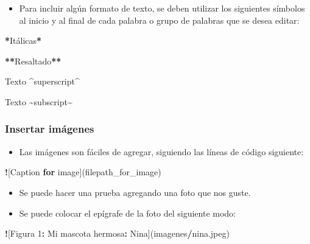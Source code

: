\documentclass[
]{article}
\newenvironment{Shaded}{\begin{snugshade}}{\end{snugshade}}
\newcommand{\ControlFlowTok}[1]{\textcolor[rgb]{0.13,0.29,0.53}{\textbf{#1}}}
\newcommand{\DecValTok}[1]{\textcolor[rgb]{0.00,0.00,0.81}{#1}}
\newcommand{\ErrorTok}[1]{\textcolor[rgb]{0.64,0.00,0.00}{\textbf{#1}}}
\newcommand{\NormalTok}[1]{#1}
\newcommand{\SpecialCharTok}[1]{\textcolor[rgb]{0.81,0.36,0.00}{\textbf{#1}}}
\providecommand{\tightlist}{%
  \setlength{\itemsep}{0pt}\setlength{\parskip}{0pt}}
\begin{document}
\begin{itemize}
\tightlist
\item
  Para incluir algún formato de texto, se deben utilizar los siguientes símbolos al inicio y al final de cada palabra o grupo de palabras que se desea editar:
\end{itemize}

\begin{Shaded}
\begin{Highlighting}[]
\SpecialCharTok{*}\NormalTok{Itálicas}\SpecialCharTok{*}
    
\ErrorTok{**}\NormalTok{Resaltado}\SpecialCharTok{**}
    
\NormalTok{Texto }\SpecialCharTok{\^{}}\NormalTok{superscript}\SpecialCharTok{\^{}}
    
\NormalTok{Texto }\SpecialCharTok{\textasciitilde{}}\NormalTok{subscript}\SpecialCharTok{\textasciitilde{}}
\end{Highlighting}
\end{Shaded}

\hypertarget{insertar-imuxe1genes}{%
\subsubsection{Insertar imágenes}\label{insertar-imuxe1genes}}

\begin{itemize}
\tightlist
\item
  Las imágenes son fáciles de agregar, siguiendo las líneas de código siguiente:
\end{itemize}

\begin{Shaded}
\begin{Highlighting}[]
\SpecialCharTok{!}\NormalTok{[Caption }\ControlFlowTok{for}\NormalTok{ image](filepath\_for\_image)}
\end{Highlighting}
\end{Shaded}

\begin{itemize}
\item
  Se puede hacer una prueba agregando una foto que nos guste.
\item
  Se puede colocar el epígrafe de la foto del siguiente modo:
\end{itemize}

\begin{Shaded}
\begin{Highlighting}[]
\SpecialCharTok{!}\NormalTok{[Figura }\DecValTok{1}\SpecialCharTok{:}\NormalTok{ Mi mascota hermosa}\SpecialCharTok{:}\NormalTok{ Nina](imagenes}\SpecialCharTok{/}\NormalTok{nina.jpeg)}
\end{Highlighting}
\end{Shaded}
\end{document}
